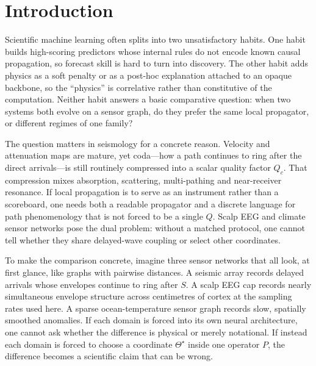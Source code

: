 \documentclass[twocolumn,10pt]{article}
\begin{document}
\section*{Introduction}

Scientific machine learning often splits into two unsatisfactory habits. One
habit builds high-scoring predictors whose internal rules do not encode known
causal propagation, so forecast skill is hard to turn into discovery. The other
habit adds physics as a soft penalty or as a post-hoc explanation attached to an
opaque backbone, so the ``physics'' is correlative rather than constitutive of
the computation. Neither habit answers a basic comparative question: when two
systems both evolve on a sensor graph, do they prefer the same local propagator,
or different regimes of one family?

The question matters in seismology for a concrete reason. Velocity and
attenuation maps are mature, yet coda---how a path continues to ring after the
direct arrivals---is still routinely compressed into a scalar quality factor
\(Q_c\). That compression mixes absorption, scattering, multi-pathing and
near-receiver resonance. If local propagation is to serve as an instrument
rather than a scoreboard, one needs both a readable propagator and a discrete
language for path phenomenology that is not forced to be a single \(Q\). Scalp
EEG and climate sensor networks pose the dual problem: without a matched
protocol, one cannot tell whether they share delayed-wave coupling or select
other coordinates.

To make the comparison concrete, imagine three sensor networks that all look,
at first glance, like graphs with pairwise distances. A seismic array records
delayed arrivals whose envelopes continue to ring after \(S\). A scalp EEG cap
records nearly simultaneous envelope structure across centimetres of cortex at
the sampling rates used here. A sparse ocean-temperature sensor graph records
slow, spatially smoothed anomalies. If each domain is forced into its own neural
architecture, one cannot ask whether the difference is physical or merely
notational. If instead each domain is forced to choose a coordinate
\(\Theta^{\star}\) inside one operator \(P\), the difference becomes a
scientific claim that can be wrong.
\end{document}
